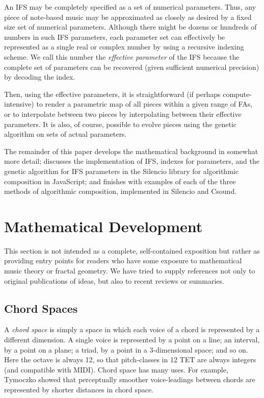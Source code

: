 \documentclass[english,11pt,letterpaper,onecolumn]{scrartcl}
\numberwithin{equation}{section}
\begin{document}
An IFS may be completely specified as a set of numerical parameters. Thus, any
piece of note-based music may be approximated as closely as desired by a fixed
size set of numerical parameters. Although there might be dozens or hundreds of
numbers in such IFS parameters, each parameter set can effectively be
represented as a single real or complex number by using a recursive indexing
scheme. We call this number the \textit{effective parameter} of the IFS because
the complete set of parameters can be recovered (given sufficient numerical
precision) by decoding the index.

Then, using the effective parameters, it is straightforward (if perhaps
compute-intensive) to render a parametric map of all pieces within a given range
of FAs, or to interpolate between two pieces by interpolating between their
effective parameters. It is also, of course, possible to evolve pieces using the
genetic algorithm on sets of actual parameters.

The remainder of this paper develops the mathematical background in somewhat
more detail; discusses the implementation of IFS, indexes for parameters, and
the genetic algorithm for IFS parameters in the Silencio library for algorithmic
composition in JavaScript; and finishes with examples of each of the three
methods of algorithmic composition, implemented in Silencio and Csound.

\section{Mathematical Development}

This section is not intended as a complete, self-contained exposition but rather
as providing entry points for readers who have some exposure to mathematical
music theory or fractal geometry. We have tried to supply references not only to
original publications of ideas, but also to recent reviews or summaries.

\subsection{Chord Spaces}

A \textit{chord space} is simply a space in which each voice of a chord is
represented by a different dimension. A single voice is represented by a point
on a line; an interval, by a point on a plane; a triad, by a point in a
3-dimensional space; and so on. Here the octave is always 12, so that
pitch-classes in 12 TET are always integers (and compatible with MIDI). Chord
space has many uses. For example, Tymoczko \cite{tymoczko2006geometry,
tymoczko2011geometry} showed that perceptually smoother voice-leadings between
chords are represented by shorter distances in chord space.
\end{document}
